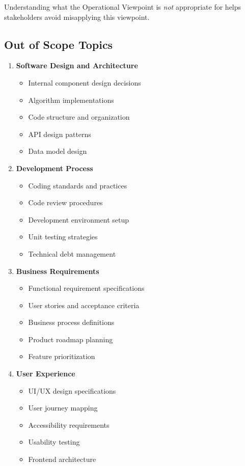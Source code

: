 \documentclass[11pt,letterpaper]{article}
\begin{document}
Understanding what the Operational Viewpoint is \emph{not} appropriate for helps stakeholders avoid misapplying this viewpoint.

\subsection{Out of Scope Topics}

\begin{enumerate}[label=\textbf{AC\arabic*:}, leftmargin=2.5em]
    \item \textbf{Software Design and Architecture}
    \begin{itemize}[nosep]
        \item Internal component design decisions
        \item Algorithm implementations
        \item Code structure and organization
        \item API design patterns
        \item Data model design
    \end{itemize}
    
    \item \textbf{Development Process}
    \begin{itemize}[nosep]
        \item Coding standards and practices
        \item Code review procedures
        \item Development environment setup
        \item Unit testing strategies
        \item Technical debt management
    \end{itemize}
    
    \item \textbf{Business Requirements}
    \begin{itemize}[nosep]
        \item Functional requirement specifications
        \item User stories and acceptance criteria
        \item Business process definitions
        \item Product roadmap planning
        \item Feature prioritization
    \end{itemize}
    
    \item \textbf{User Experience}
    \begin{itemize}[nosep]
        \item UI/UX design specifications
        \item User journey mapping
        \item Accessibility requirements
        \item Usability testing
        \item Frontend architecture
    \end{itemize}
    

\end{enumerate}
\end{document}
